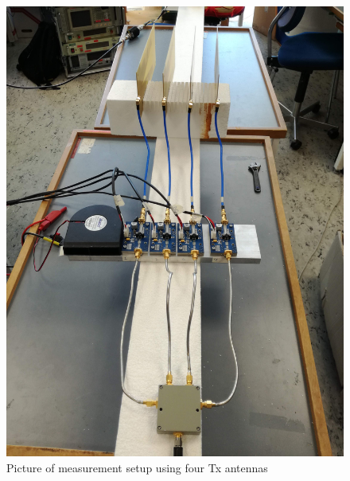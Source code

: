 \begin{figure}[H]
\centering 
\includegraphics[scale = 0.1]{figures/measurement/cree/meas4/meas4.jpg}
\caption{Picture of measurement setup using four Tx antennas}
\label{fig:meas_amp4}
\end{figure}

